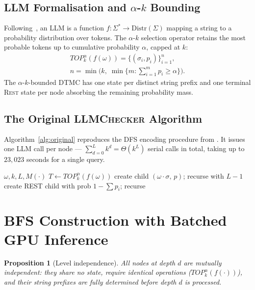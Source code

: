 \documentclass{article}
\newtheorem{proposition}[theorem]{Proposition}
\newcommand{\Distr}{\mathrm{Distr}}
\newcommand{\topka}{T\!O\!P^\alpha_k}
\begin{document}
\subsection{LLM Formalisation and $\alpha$-$k$ Bounding}

Following~\citet{gross2025llmchecker}, an LLM is a function
$f: \Sigma^* \to \Distr(\Sigma)$ mapping a string to a probability distribution
over tokens.
The $\alpha$-$k$ selection operator retains the most probable tokens up to
cumulative probability $\alpha$, capped at $k$:
\begin{multline}
  \topka(f(\omega)) = \{(\sigma_i, p_i)\}_{i=1}^{n}, \\
  n = \min\!\bigl(k,\;\min\{m : \textstyle\sum_{i=1}^m p_i \ge \alpha\}\bigr).
\end{multline}
The $\alpha$-$k$-bounded DTMC has one state per distinct string prefix and one
terminal \textsc{Rest} state per node absorbing the remaining probability mass.

\subsection{The Original \textsc{LLMChecker} Algorithm}

Algorithm~\ref{alg:original} reproduces the DFS encoding procedure from
\citet{gross2025llmchecker}.
It issues one LLM call per node — $\sum_{d=0}^{L} k^d = \Theta(k^L)$ serial
calls in total, taking up to $23{,}023$ seconds for a single query.

\begin{algorithm}[tb]
\caption{Original DFS DTMC construction~\citep{gross2025llmchecker}}
\label{alg:original}
\begin{algorithmic}[1]
\Require $\omega, k, L, M(\cdot)$
\State $T \gets \topka(f(\omega))$ 
  \State create child $(\omega\cdot\sigma,\, p)$; recurse with $L{-}1$
\EndFor
\State create REST child with prob $1 - \sum p_i$; recurse
\end{algorithmic}
\end{algorithm}

\section{BFS Construction with Batched GPU Inference}
\label{sec:bfs}

\begin{proposition}[Level independence]
\label{prop:level-independence}
All nodes at depth $d$ are mutually independent: they share no state,
require identical operations ($\topka(f(\cdot))$), and their string prefixes
are fully determined before depth $d$ is processed.
\end{proposition}
\end{document}
